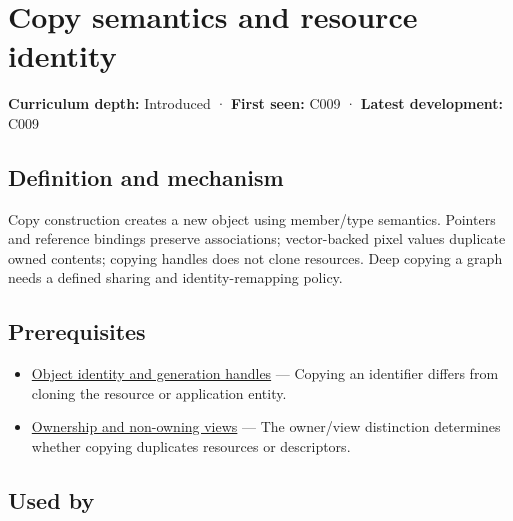 \hypertarget{appendix-1340cd1ce582}{}\label{referencestart:appendix-1340cd1ce582}
\section{Copy semantics and resource identity}\label{appendix-1340cd1ce582-copy-semantics-and-resource-identity}

\hypertarget{appendix-1340cd1ce582-copy-semantics-and-resource-identity}{}

\textbf{Curriculum depth:} Introduced · \textbf{First seen:} C009 · \textbf{Latest development:} C009

\begin{allmightroledefinition}

\subsection{Definition and mechanism}\label{appendix-1340cd1ce582-definition-and-mechanism}

\hypertarget{appendix-1340cd1ce582-definition-and-mechanism}{}

Copy construction creates a new object using member/type semantics. Pointers and reference bindings preserve associations; vector-backed pixel values duplicate owned contents; copying handles does not clone resources. Deep copying a graph needs a defined sharing and identity-remapping policy.

\end{allmightroledefinition}

\subsection{Prerequisites}\label{appendix-1340cd1ce582-prerequisites}

\hypertarget{appendix-1340cd1ce582-prerequisites}{}

\begin{itemize}
\tightlist
\item
  \hyperref[appendix-f1581457d322]{Object identity and generation handles} --- Copying an identifier differs from cloning the resource or application entity.
\item
  \hyperref[appendix-d52e4486f527]{Ownership and non-owning views} --- The owner/view distinction determines whether copying duplicates resources or descriptors.
\end{itemize}

\subsection{Used by}\label{appendix-1340cd1ce582-used-by}

